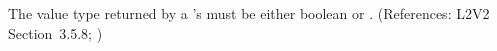 The value type returned by a \FunctionDefinition's  must be
either boolean or .  (References: L2V2 Section~3.5.8;
)
